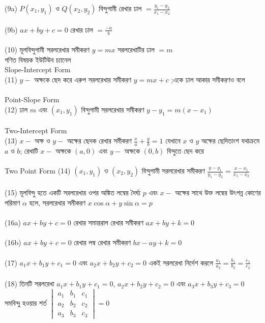 \documentclass{article}
\begin{document}
	(9a)	$P(x_1,y_1)$ ও $Q(x_2,y_2)$ বিন্দুগামী রেখার ঢাল $=\frac{y_1-y_2}{x_1-x_2}$\\
		\\
	(9b) $ax+by+c=0$ রেখার ঢাল $=\frac{-a}{b}$ \\
	\\
			(10)	মূলবিন্দুগামী সরলরেখার সমীকরণ  $y=mx$ সরলরেখাটির ঢাল $=m$\\
				গণিত বিষয়ক ইউটিউব চ্যানেল \\
				Slope-Intercept Form\\
			(11)	$y-$ অক্ষকে ছেদ করে এরুপ সরলরেখার সমীকরণ $y=mx+c$ ;একে ঢাল আকার সমীকরণও বলে \\
				\\
				Point-Slope Form\\
		(12)	ঢাল	$m$ এবং  $(x_1,y_1)$ বিন্দুগামী সরলরেখার সমীকরণ $y-y_1=m(x-x_1)$\\
			\\
			Two-Intercept Form\\
		(13)	$x-$ অক্ষ ও $y-$ অক্ষের ছেদক রেখার সমীকরণ $\frac{x}{a}+\frac{y}{b}=1$ যেখানে $x$ ও $y$ অক্ষের ছেদিতাংশ যথাক্রমে $a$ ও $b$; রেখাটি $x-$ অক্ষকে $(a,0)$  এবং $y-$ অক্ষকে $(0,b)$  বিন্দুতে ছেদ করে \\
			\\
	Two Point Form	(14)	$(x_1,y_1)$ ও $(x_2,y_2)$ বিন্দুগামী সরলরেখার সমীকরণ  $\frac{y-y_1}{y_1-y_2}=\frac{x-x_1}{x_1-x_2}$\\
			\\
		(15)	মূলবিন্দু হতে একটি সরলরেখার ওপর অঙ্কিত লম্বের দৈর্ঘ্য $p$ এবং $x-$ অক্ষের সাথে উক্ত লম্বের উৎপন্ন কোণের পরিমাণ $\alpha$ হলে, সরলরেখার সমীকরণ $x\cos \alpha +y \sin \alpha =p$\\
			\\
			(16a)	$ax+by+c=0$ রেখার সমান্তরাল রেখার সমীকরণ 	$ax+by+k=0$ \\
				\\
				(16b)	$ax+by+c=0$  রেখার লম্ব রেখার সমীকরণ  	$bx-ay+k=0$ \\
					\\
			(17)	$a_1x+b_1y+c_1=0$ এবং  $a_2x+b_2y+c_2=0$ একই সরলরেখা নির্দেশ করলে  $\frac{a_1}{a_2}=\frac{b_1}{b_2}=\frac{c_1}{c_2}$\\
				\\
			(18)	 তিনটি সরলরেখা 	$a_1x+b_1y+c_1=0$,  $a_2x+b_2y+c_2=0$  এবং  $a_3x+b_3y+c_3=0$ সমবিন্দু হওয়ার শর্ত 
				$\begin{vmatrix}
					a_1&b_1&c_1\\
					a_2&b_2&c_2\\
					a_3&b_3&c_3
				\end{vmatrix}=0$\\
\end{document}
